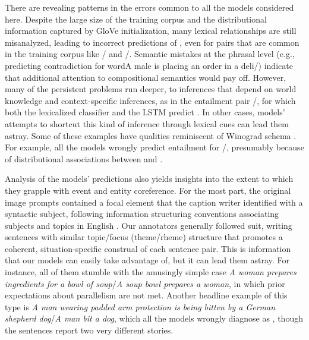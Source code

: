 There are revealing patterns in the errors common to all the models
considered here. Despite the large size of the training corpus and the
distributional information captured by GloVe initialization, many
lexical relationships are still misanalyzed, leading to incorrect
predictions of , even for pairs that are common in the
training corpus like / and
/. Semantic mistakes at the phrasal level
(e.g., predicting contradiction for word{A male is placing an order in a 
deli}/) indicate
that additional attention to compositional semantics would pay off.
%
However, many of the persistent problems run deeper, to inferences
that depend on world knowledge and context-specific inferences, as in
the entailment pair /, for which both
the lexicalized classifier and the LSTM predict . 
In other cases, models' attempts to shortcut this kind of inference 
through lexical cues can lead them astray. 
Some of these examples have qualities
reminiscent of Winograd schema \cite{Winograd:1972,Levesque:2013}. For
example, all the models wrongly predict
entailment for /, presumably because of
distributional associations between  and .

Analysis of the models' predictions also yields insights into the
extent to which they grapple with event and entity coreference. For
the most part, the original image prompts contained a focal element
that the caption writer identified with a syntactic subject, following
information structuring conventions associating subjects and topics in
English \cite{Ward04}. Our annotators generally followed suit, writing
sentences with similar topic/focus (theme/rheme) structure that
promotes a coherent, situation-specific construal of each sentence
pair. This is information that our models can easily take advantage
of, but it can lead them astray. For instance, all of them stumble
with the amusingly simple case \emph{A woman prepares ingredients for
  a bowl of soup}/\emph{A soup bowl prepares a woman}, in which prior
expectations about parallelism are not met. Another headline example
of this type is \emph{A man wearing padded arm protection is being
  bitten by a German shepherd dog}/\emph{A man bit a dog}, which all
the models wrongly diagnose as , though the sentences
report two very different stories.

